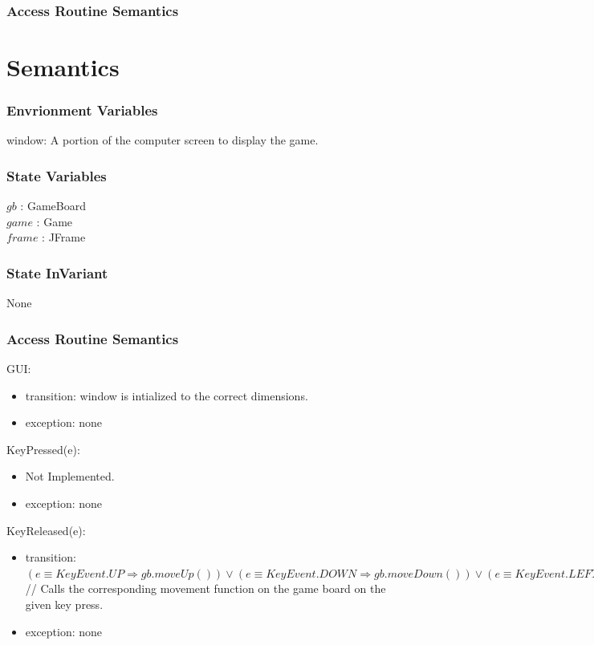 \documentclass[12pt]{article}
\begin{document}
\subsubsection*{Access Routine Semantics}

\section*{Semantics}

\subsubsection*{Envrionment Variables}

window: A portion of the computer screen to display the game.

\subsubsection*{State Variables}

$gb$ : GameBoard\\
$game$ : Game\\
$frame$ : JFrame

\subsubsection*{State InVariant}

None

\subsubsection*{Access Routine Semantics}

\noindent GUI:
\begin{itemize}
    \item transition: window is intialized to the correct dimensions.
    \item exception: none
\end{itemize}

\noindent KeyPressed(e):
\begin{itemize}
    \item Not Implemented.
    \item exception: none
\end{itemize}

\noindent KeyReleased(e):
\begin{itemize}
    \item transition: $(e \equiv KeyEvent.UP \Rightarrow gb.moveUp()) \lor
    (e \equiv KeyEvent.DOWN \Rightarrow gb.moveDown()) \lor (e \equiv
    KeyEvent.LEFT \Rightarrow gb.moveLeft()) \lor (e \equiv KeyEvent.RIGHT
    \Rightarrow gb.moveRIGHT())$\\
    // Calls the corresponding movement function on the game board on the
    given key press.
    \item exception: none
\end{itemize}
\end{document}
